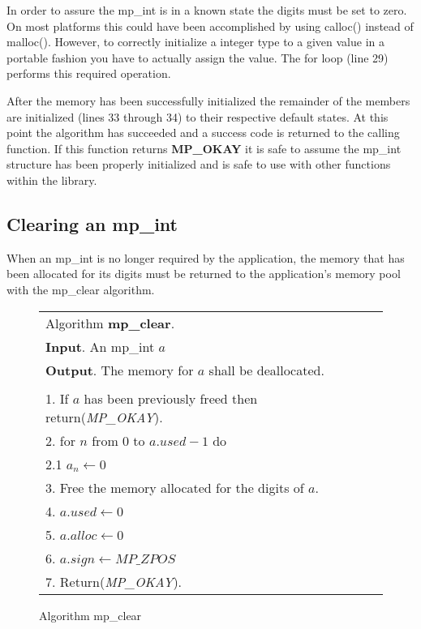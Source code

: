 \documentclass[b5paper]{book}
\begin{document}
In order to assure the mp\_int is in a known state the digits must be set to zero.  On most platforms this could have been
accomplished by using calloc() instead of malloc().  However,  to correctly initialize a integer type to a given value in a 
portable fashion you have to actually assign the value.  The for loop (line 29) performs this required
operation.

After the memory has been successfully initialized the remainder of the members are initialized 
(lines 33 through 34) to their respective default states.  At this point the algorithm has succeeded and
a success code is returned to the calling function.  If this function returns \textbf{MP\_OKAY} it is safe to assume the 
mp\_int structure has been properly initialized and is safe to use with other functions within the library.  

\subsection{Clearing an mp\_int}
When an mp\_int is no longer required by the application, the memory that has been allocated for its digits must be 
returned to the application's memory pool with the mp\_clear algorithm.

\begin{figure}[here]
\begin{center}
\begin{tabular}{l}
\hline Algorithm \textbf{mp\_clear}. \\
\textbf{Input}.   An mp\_int $a$ \\
\textbf{Output}.  The memory for $a$ shall be deallocated.  \\
\hline \\
1.  If $a$ has been previously freed then return(\textit{MP\_OKAY}). \\
2.  for $n$ from 0 to $a.used - 1$ do \\
\hspace{3mm}2.1  $a_n \leftarrow 0$ \\
3.  Free the memory allocated for the digits of $a$. \\
4.  $a.used \leftarrow 0$ \\
5.  $a.alloc \leftarrow 0$ \\
6.  $a.sign \leftarrow MP\_ZPOS$ \\
7.  Return(\textit{MP\_OKAY}). \\
\hline
\end{tabular}
\end{center}
\caption{Algorithm mp\_clear}
\end{figure}
\end{document}
